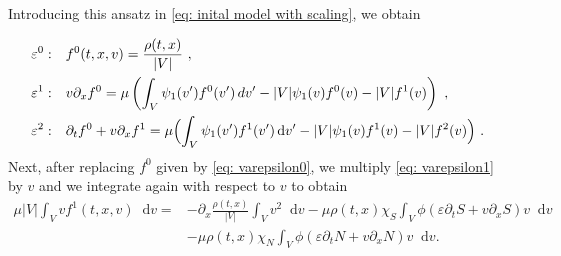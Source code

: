 \documentclass[11pt,twoside]{article}
\numberwithin{equation}{section}
\newcommand*\diff{\mathop{}\!\mathrm{d}}
\theoremstyle{plain}
\theoremstyle{nonumberplain}
\begin{document}
Introducing this ansatz in \eqref{eq: inital model with scaling}, we obtain

\begin{align}
    \varepsilon^0: & \quad f^0(t,{x},{v})=\frac{\rho(t,{x})}{|V|}\ ,\label{eq: varepsilon0}\\
    \varepsilon^1: & \quad 
    v \partial_x f^0
=
\mu \left(
\int_V \psi_1(v') f^0(v')\,dv'
- |V| \psi_1(v) f^0(v)
- |V| f^1(v)
\right)\ ,\label{eq: varepsilon1}\\
    \varepsilon^2: & \quad \partial_tf^0+{v}\partial_x f^1 =\mu\Bigl(\int_V\psi_1(v')f^1(v')\diff v'-|V|\psi_1(v)f^1(v)-|V|f^2(v)\Bigr) \ \label{eq: varepsilon2}.\
\end{align}
Next, after replacing $f^0$ given by  \eqref{eq: varepsilon0}, we multiply \eqref{eq: varepsilon1} by ${v}$ and we integrate again with respect to ${v}$ to obtain
\begin{align}
    \mu|V|\int_V vf^1(t,x,v) \diff v=&-\partial_x\frac{\rho(t,x)}{|V|}\int_V v^2\diff v-\mu\rho(t,x)\chi_S\int_V\phi(\varepsilon\partial_tS+v\partial_xS)v\diff v\nonumber\\ &-\mu\rho(t,x)\chi_N\int_V\phi(\varepsilon\partial_tN+v\partial_xN)v\diff v.\label{eq: mean direction}
\end{align}
\end{document}
